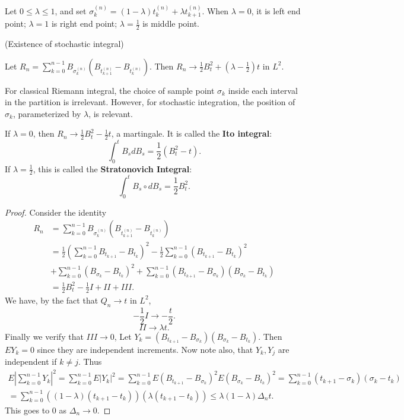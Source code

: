 Let $0 \le  \lambda \le 1$, and set $\sigma_k^{(n)} = (1 - \lambda) t_k^{(n)} + \lambda t_{k+1}^{(n)}$. When $\lambda = 0$, it is left end point; $\lambda = 1$ is right end point; $\lambda = \frac{1}{2}$ is middle point.



\begin{theorem}(Existence of stochastic integral)

	Let $R_n = \sum_{k=0}^{n-1} B_{\sigma_k^{(n)}} \left( B_{t_{k+1}^{(n)}} - B_{t_k^{(n)}} \right) $. Then $R_n \to \frac{1}{2} B_t^2 + (\lambda - \frac{1}{2}) t$ in $L^2$.
\end{theorem}
\begin{remark}
	For classical Riemann integral, the choice of sample point $\sigma_k$ inside each interval in the partition is irrelevant. However, for stochastic integration, the position of $\sigma_k$, parameterized by $\lambda$, is relevant. 
\end{remark}

If $\lambda = 0$, then $R_n \to \frac{1}{2} B_t^2 - \frac{1}{2} t$, a martingale. It is called the \textbf{Ito integral}:
\[
	\int _0^t B_s dB_s = \frac{1}{2}\left( B_t^2  - t\right) 
.\] 
If $\lambda = \frac{1}{2}$, this is called the \textbf{Stratonovich Integral}:
\[
	\int _0^t B_s \circ d B_s = \frac{1}{2} B_t^2
.\] 

\begin{proof}
	Consider the identity
	\begin{align*}
		R_n &= \sum_{k=0}^{n-1} B_{\sigma_k^{(n)}} \left( B_{t_{k+1}^{(n)}} - B_{t_k^{(n)}} \right)  \\
		&= \frac{1}{2} \left( \sum_{k=0}^{n-1} B_{t_{k+1}} - B_{t_k} \right) ^2 - \frac{1}{2} \sum_{k=0}^{n-1} \left( B_{t_{k+1}} - B_{t_k} \right) ^2 \\
		&+ \sum_{k=0}^{n-1} \left( B_{\sigma_k} - B_{t_k} \right) ^2 + \sum_{k=0}^{n-1} \left( B_{t_{k+1}} - B_{\sigma_k} \right) \left( B_{\sigma_k} - B_{t_k} \right) \\
		&= \frac{1}{2}B_t^2 - \frac{1}{2} I + II + III
	.\end{align*}
	We have, by the fact that $Q_n \to  t$ in $L^2$,
	\[
		- \frac{1}{2} I \to  - \frac{t}{2}
	.\] 
	\[
		II \to  \lambda t
	.\] 
	Finally we verify that $III \to  0$,
	Let $Y_k = \left( B_{t_{k+1}} - B_{\sigma_k} \right) \left( B_{\sigma_k} - B_{t_k} \right) $. Then $EY_k = 0$ since they are independent increments. Now note also, that $Y_k, Y_j$ are independent if $k \neq j$. Thus
	\begin{multline*}
		E| \sum_{k=0}^{n-1} Y_k |^2 
		= \sum_{k=0}^{n-1} E|Y_k|^2
		= \sum_{k=0}^{n-1} E\left( B_{t_{k+1}} - B_{\sigma_k} \right) ^2 E\left( B_{\sigma_k} - B_{t_k} \right) ^2
		= \sum_{k=0}^{n-1} (t_{k+1} - \sigma_k) (\sigma_k - t_k)\\
		= \sum_{k = 0}^{n - 1} \left( (1 - \lambda) (t_{k+1} - t_k) \right) \left( \lambda \left( t_{k+1} - t_k \right)  \right) 
		\le \lambda (1 - \lambda) \Delta_n t
	.\end{multline*} 
	This goes to $0$ as $\Delta_n \to  0$.

\end{proof}


